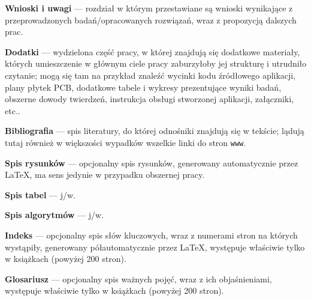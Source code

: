 \begin{description}[
    leftmargin = !,
    labelwidth = 1em,
]
    \item[5.] \textbf{Wnioski i uwagi} --- rozdział w którym przestawiane są wnioski wynikające z przeprowadzonych badań/opracowanych rozwiązań, wraz z propozycją dalszych prac.
    \item[]   \textbf{Dodatki} --- wydzielona część pracy, w której znajdują się dodatkowe materiały, których umieszczenie w głównym ciele pracy zaburzyłoby jej strukturę i utrudniło czytanie; mogą się tam na przykład znaleźć wycinki kodu źródłowego aplikacji, plany płytek PCB, dodatkowe tabele i wykresy prezentujące wyniki badań, obszerne dowody twierdzeń, instrukcja obsługi stworzonej aplikacji, załączniki, etc..
    \item[]   \textbf{Bibliografia} --- spis literatury, do której odnośniki znajdują się w tekście; lądują tutaj również w większości wypadków wszelkie linki do stron \texttt{www}.
    \item[]   \textbf{Spis rysunków} --- opcjonalny spis rysunków, generowany automatycznie przez \LaTeX{}, ma sens jedynie w przypadku obszernej pracy.
    \item[]   \textbf{Spis tabel} --- j/w.
    \item[]   \textbf{Spis algorytmów} --- j/w.
    \item[]   \textbf{Indeks} --- opcjonalny spis słów kluczowych, wraz z numerami stron na których wystąpiły, generowany półautomatycznie przez \LaTeX{}, występuje właściwie tylko w książkach (powyżej 200 stron).
    \item[]   \textbf{Glosariusz} --- opcjonalny spis ważnych pojęć, wraz z ich objaśnieniami, występuje właściwie tylko w książkach (powyżej 200 stron).   
\end{description}